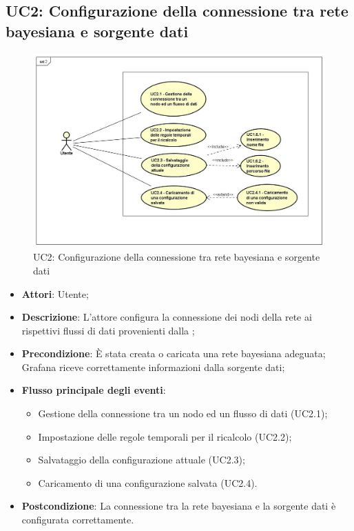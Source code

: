 \subsection{UC2: Configurazione della connessione tra rete bayesiana e sorgente dati}
\hypertarget{UC2}{}
\begin{figure} [H]
	\centering
	\includegraphics[scale=0.45]{Img/UC2}
	\caption{UC2: Configurazione della connessione tra rete bayesiana e sorgente dati}\label{}
\end{figure}
\begin{itemize}
	\item \textbf{Attori}: Utente;
	\item \textbf{Descrizione}: L'attore configura la connessione dei nodi della rete ai rispettivi flussi di dati provenienti dalla ;
	\item \textbf{Precondizione}: È stata creata o caricata una rete bayesiana adeguata; Grafana riceve correttamente informazioni dalla sorgente dati;
	\item \textbf{Flusso principale degli eventi}:
	\begin{itemize}
		\item Gestione della connessione tra un nodo ed un flusso di dati (UC2.1);
		\item Impostazione delle regole temporali per il ricalcolo (UC2.2);
		\item Salvataggio della configurazione attuale (UC2.3);
		\item Caricamento di una configurazione salvata (UC2.4).
	\end{itemize}
	\item \textbf{Postcondizione}: La connessione tra la rete bayesiana e la sorgente dati è configurata correttamente.
\end{itemize}

